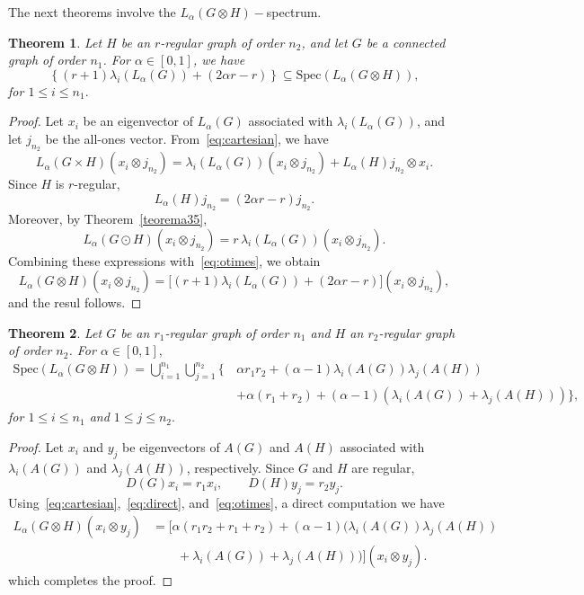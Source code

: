 \documentclass{article}
\newtheorem{theorem}{Theorem}[section]
\begin{document}
The next theorems involve the $L_\alpha(G \otimes  H)-$spectrum.

\begin{theorem}
Let $H$ be an $r$-regular graph of order $n_2$, and let $G$ be a connected graph of order $n_1$. For $\alpha \in [0,1]$, we have
\[
\left\{
(r+1)\lambda_i(L_\alpha(G)) + (2\alpha r - r)
\right\}
\subseteq
\mathrm{Spec}(L_\alpha(G \otimes H)),
\]
for $1 \le i \le n_1.$
\end{theorem}

\begin{proof}
Let $x_i$ be an eigenvector of $L_\alpha(G)$ associated with $\lambda_i(L_\alpha(G))$, and let $j_{n_2}$ be the all-ones vector. From~\eqref{eq:cartesian}, we have
\[
L_\alpha(G \times H)(x_i \otimes j_{n_2})
=
\lambda_i(L_\alpha(G)) (x_i \otimes j_{n_2})
+
L_\alpha(H)j_{n_2} \otimes x_i.
\]
Since $H$ is $r$-regular,
\[
L_\alpha(H)j_{n_2} = (2\alpha r - r)j_{n_2}.
\]
Moreover, by Theorem~\ref{teorema35},
\[
L_\alpha(G \odot H)(x_i \otimes j_{n_2})
=
r\,\lambda_i(L_\alpha(G))(x_i \otimes j_{n_2}).
\]
Combining these expressions with~\eqref{eq:otimes}, we obtain
\[
L_\alpha(G \otimes H)(x_i \otimes j_{n_2})
=
\big[(r+1)\lambda_i(L_\alpha(G)) + (2\alpha r - r)\big](x_i \otimes j_{n_2}),
\]
and the resul follows.
\end{proof}

\begin{theorem}
Let $G$ be an $r_1$-regular graph of order $n_1$ and $H$ an $r_2$-regular graph of order $n_2$. For $\alpha \in [0,1],$
\begin{equation*}
\begin{aligned}
\mathrm{Spec}(L_{\alpha}(G \otimes H)) 
= \bigcup_{i=1}^{n_{1}} \bigcup_{j=1}^{n_{2}} \Big\{ \,
& \alpha r_{1} r_{2} + (\alpha-1) \lambda_{i}(A(G)) \lambda_{j}(A(H)) \\[4pt]
& + \alpha (r_1 + r_2) + (\alpha-1)(\lambda_i(A(G)) + \lambda_j(A(H)))
\Big\},
\end{aligned}
\end{equation*}
for $1 \le i \le n_1$ and $1 \le j \le n_2.$
\end{theorem}

\begin{proof}
Let $x_i$ and $y_j$ be eigenvectors of $A(G)$ and $A(H)$ associated with $\lambda_i(A(G))$ and $\lambda_j(A(H))$, respectively. Since $G$ and $H$ are regular,
\[
D(G)x_i = r_1 x_i, \qquad D(H)y_j = r_2 y_j.
\]
Using~\eqref{eq:cartesian},~\eqref{eq:direct}, and~\eqref{eq:otimes}, a direct computation we have
\begin{align*}
L_\alpha(G \otimes H)(x_i \otimes y_j)
&=
\Big[
\alpha(r_1 r_2 + r_1 + r_2)
+ (\alpha-1)\big(\lambda_i(A(G))\lambda_j(A(H)) \\
&\qquad + \lambda_i(A(G)) + \lambda_j(A(H))\big)
\Big](x_i \otimes y_j).
\end{align*}
which completes the proof.
\end{proof}
\end{document}
